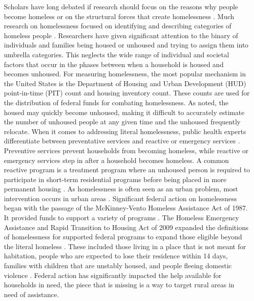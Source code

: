 Scholars have long debated if research should focus on the reasons why people become homeless or on the structural forces that create homelessness \citep{shlay_social_2003}. Much research on homelessness focused on identifying and describing categories of homeless people \citep{lee_homelessness_2021}. Researchers have given significant attention to the binary of individuals and families being housed or unhoused and trying to assign them into umbrella categories. This neglects the wide range of individual and societal factors that occur in the phases between when a household is housed and becomes unhoused. For measuring homelessness, the most popular mechanism in the United States is the Department of Housing and Urban Development (HUD) point-in-time (PIT) count and housing inventory count. These counts are used for the distribution of federal funds for combating homelessness. As \citet{agans_enumerating_2014} noted, the housed may quickly become unhoused, making it difficult to accurately estimate the number of unhoused people at any given time and the unhoused frequently relocate. When it comes to addressing literal homelessness, public health experts differentiate between preventative services and reactive or emergency services \citep{oregan_how_2021}. Preventive services prevent households from becoming homeless, while reactive or emergency services step in after a household becomes homeless. A common reactive program is a treatment program where an unhoused person is required to participate in short-term residential programs before being placed in more permanent housing \citep{evans_reducing_2019}. As homelessness is often seen as an urban problem, most intervention occurs in urban areas \citep{gleason_using_2021}. Significant federal action on homelessness began with the passage of the McKinney-Vento Homeless Assistance Act of 1987. It provided funds to support a variety of programs \citep{evans_reducing_2019}. The Homeless Emergency Assistance and Rapid Transition to Housing Act of 2009 expanded the definitions of homelessness for supported federal programs to expand those eligible beyond the literal homeless \citep{berg_hearth_2013}. These included those living in a place that is not meant for habitation, people who are expected to lose their residence within 14 days, families with children that are unstably housed, and people fleeing domestic violence \citep{evans_reducing_2019}. Federal action has significantly impacted the help available for households in need, the piece that is missing is a way to target rural areas in need of assistance. 

